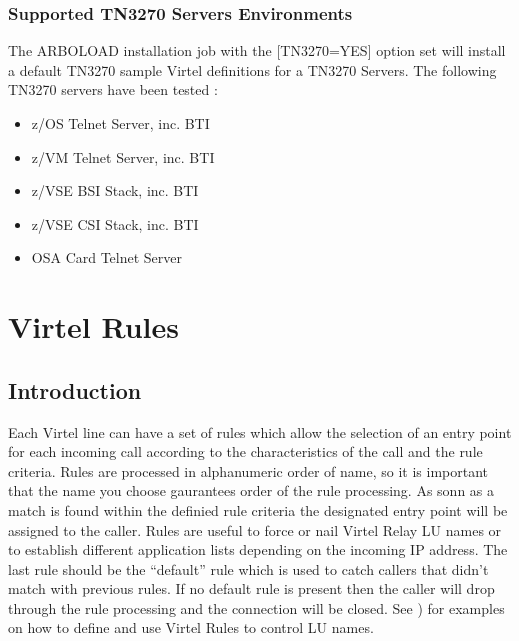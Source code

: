 \documentclass[letterpaper,10pt,english]{sphinxmanual}
\begin{document}
\subsection{Supported TN3270 Servers Environments}
\label{\detokenize{connectivity_guide:supported-tn3270-servers-environments}}\label{\detokenize{connectivity_guide:index-93}}
\sphinxAtStartPar
The ARBOLOAD installation job with the {[}TN3270=YES{]} option set will install a default TN3270 sample Virtel definitions for a TN3270 Servers. The following TN3270 servers have been tested :
\begin{itemize}
\item {} 
\sphinxAtStartPar
z/OS Telnet Server, inc. BTI

\item {} 
\sphinxAtStartPar
z/VM Telnet Server, inc. BTI

\item {} 
\sphinxAtStartPar
z/VSE BSI Stack, inc. BTI

\item {} 
\sphinxAtStartPar
z/VSE CSI Stack, inc. BTI

\item {} 
\sphinxAtStartPar
OSA Card Telnet Server

\end{itemize}


\chapter{Virtel Rules}
\label{\detokenize{connectivity_guide:virtel-rules}}

\section{Introduction}
\label{\detokenize{connectivity_guide:id45}}
\sphinxAtStartPar
Each Virtel line can have a set of rules which allow the selection of an entry point for each incoming call according to the characteristics of the call and the rule criteria. Rules are processed in alphanumeric order of name, so it is important that the name you choose gaurantees order of the rule processing. As sonn as a match is found within the definied rule criteria the designated entry point will be assigned to the caller. Rules are useful to force or nail Virtel Relay LU names or to establish different application lists depending on the incoming IP address. The last rule should be the “default” rule which is used to catch callers that didn’t match with previous rules. If no default rule is present then the caller will drop through the rule processing and the connection will be closed. See {\hyperref[\detokenize{connectivity_guide:v462cn-forceluname}]{}}) for examples on how to define and use Virtel Rules to control LU names.
\end{document}
